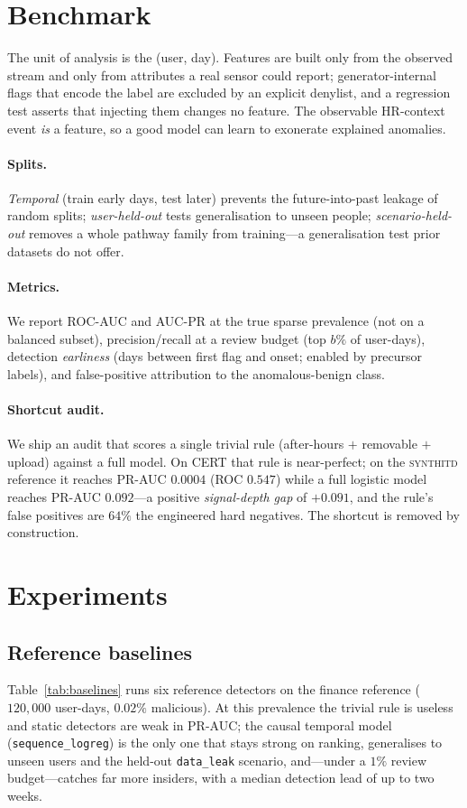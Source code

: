 \documentclass[11pt]{article}
\newcommand{\sys}{\textsc{synthitd}}
\newcommand{\code}[1]{\texttt{\small #1}}
\begin{document}
\section{Benchmark}
\label{sec:benchmark}
The unit of analysis is the (user, day). Features are built only from the observed
stream and only from attributes a real sensor could report; generator-internal flags
that encode the label are excluded by an explicit denylist, and a regression test
asserts that injecting them changes no feature. The observable HR-context event
\emph{is} a feature, so a good model can learn to exonerate explained anomalies.

\paragraph{Splits.} \emph{Temporal} (train early days, test later) prevents the
future-into-past leakage of random splits; \emph{user-held-out} tests generalisation
to unseen people; \emph{scenario-held-out} removes a whole pathway family from
training---a generalisation test prior datasets do not offer.

\paragraph{Metrics.} We report ROC-AUC and AUC-PR at the true sparse prevalence (not on
a balanced subset), precision/recall at a review budget (top $b\%$ of user-days),
detection \emph{earliness} (days between first flag and onset; enabled by precursor
labels), and false-positive attribution to the anomalous-benign class.

\paragraph{Shortcut audit.} We ship an audit that scores a single trivial rule
(after-hours $+$ removable $+$ upload) against a full model. On CERT that rule is
near-perfect; on the \sys{} reference it reaches PR-AUC $0.0004$ (ROC $0.547$) while a
full logistic model reaches PR-AUC $0.092$---a positive \emph{signal-depth gap} of
$+0.091$, and the rule's false positives are $64\%$ the engineered hard negatives.
The shortcut is removed by construction.

\section{Experiments}
\label{sec:exp}

\subsection{Reference baselines}
Table~\ref{tab:baselines} runs six reference detectors on the finance reference
($120{,}000$ user-days, $0.02\%$ malicious). At this prevalence the trivial rule is
useless and static detectors are weak in PR-AUC; the causal temporal model
(\code{sequence\_logreg}) is the only one that stays strong on ranking, generalises to
unseen users and the held-out \code{data\_leak} scenario, and---under a $1\%$ review
budget---catches far more insiders, with a median detection lead of up to two weeks.
\end{document}
